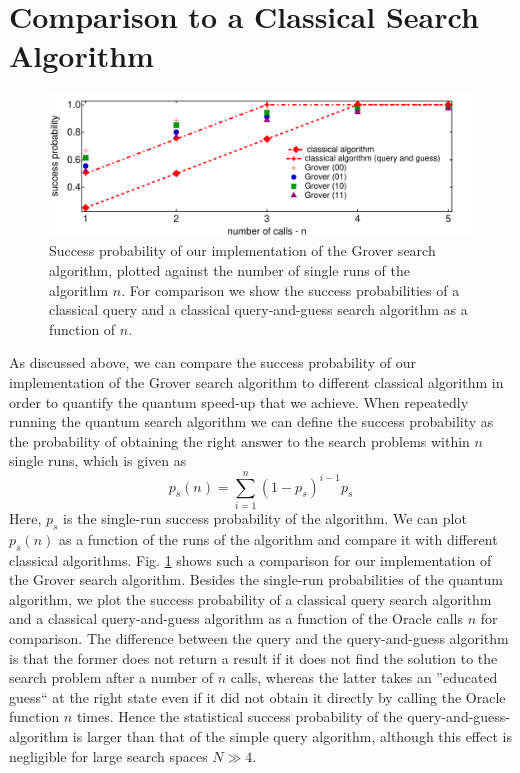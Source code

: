 \section{Comparison to a Classical Search Algorithm}

\begin{figure}[h!]
	\centering
	\includegraphics[width=1\textwidth]{"./material/mathematica/comparision_grover_classical"}
	\caption[]{Success probability of our implementation of the Grover search algorithm, plotted against the number of single runs of the algorithm $n$. For comparison we show the success probabilities of a classical query and a classical query-and-guess search algorithm as a function of $n$.}
	\label{fig:comparison_grover_classical}
\end{figure}

As discussed above, we can compare the success probability of our implementation of the Grover search algorithm to different classical algorithm in order to quantify the quantum speed-up that we achieve. When repeatedly running the quantum search algorithm we can define the success probability as the probability of obtaining the right answer to the search problems within $n$ single runs, which is given as
%
\begin{equation}
p_s(n) = \sum\limits_{i=1}^n (1-p_s)^{i-1}p_s
\end{equation}
%
Here, $p_s$ is the single-run success probability of the algorithm. We can plot $p_s(n)$ as a function of the runs of the algorithm and compare it with different classical algorithms. Fig. \ref{fig:comparison_grover_classical} shows such a comparison for our implementation of the Grover search algorithm. Besides the single-run probabilities of the quantum algorithm, we plot the success probability of a classical query search algorithm and a classical query-and-guess algorithm as a function of the Oracle calls $n$ for comparison. The difference between the query and the query-and-guess algorithm is that the former does not return a result if it does not find the solution to the search problem after a number of $n$ calls, whereas the latter takes an ''educated guess`` at the right state even if it did not obtain it directly by calling the Oracle function $n$ times. Hence the statistical success probability of the query-and-guess-algorithm is larger than that of the simple query algorithm, although this effect is negligible for large search spaces $N\gg 4$.

